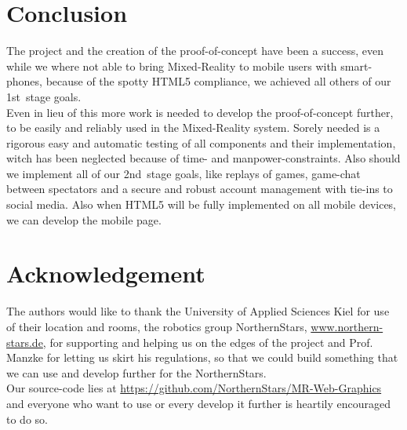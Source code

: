\documentclass[journal]{IEEEtran}
\begin{document}
\section{Conclusion}
The project and the creation of the proof-of-concept have been a success, even
while we where not able to bring Mixed-Reality to mobile users with smart-phones, because of the spotty HTML5 compliance, we achieved all others of our 1st~stage goals.\\
Even in lieu of this more work is needed to develop the proof-of-concept
further, to be easily and reliably used in the Mixed-Reality system. Sorely needed is a rigorous easy  and automatic testing of all components and their implementation, witch has been neglected because of time- and manpower-constraints. Also should we implement all of our 2nd~stage goals, like replays of games, game-chat between spectators and a secure and robust account management with tie-ins to social media. Also when HTML5 will be fully implemented on all mobile devices, we can develop the mobile page.
\section*{Acknowledgement}
The authors would like to thank the University of Applied Sciences Kiel for use
of their location and rooms, the robotics group NorthernStars,
\url{www.northern-stars.de}, for supporting and helping us on the edges of the project and Prof. Manzke for letting us skirt his regulations, so that we could build something that we can use and develop further for the NorthernStars.\\
Our source-code lies at \url{https://github.com/NorthernStars/MR-Web-Graphics} and everyone who want to use or every develop it further is heartily encouraged to do so.
\end{document}
